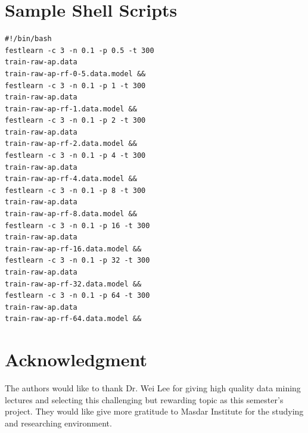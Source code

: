 \documentclass[journal]{IEEEtran}
\begin{document}
\appendices
\section{Sample Shell Scripts}

\begin{verbatim}
#!/bin/bash
festlearn -c 3 -n 0.1 -p 0.5 -t 300 
train-raw-ap.data 
train-raw-ap-rf-0-5.data.model &&
festlearn -c 3 -n 0.1 -p 1 -t 300 
train-raw-ap.data 
train-raw-ap-rf-1.data.model &&
festlearn -c 3 -n 0.1 -p 2 -t 300 
train-raw-ap.data 
train-raw-ap-rf-2.data.model &&
festlearn -c 3 -n 0.1 -p 4 -t 300 
train-raw-ap.data 
train-raw-ap-rf-4.data.model &&
festlearn -c 3 -n 0.1 -p 8 -t 300 
train-raw-ap.data 
train-raw-ap-rf-8.data.model &&
festlearn -c 3 -n 0.1 -p 16 -t 300 
train-raw-ap.data 
train-raw-ap-rf-16.data.model &&
festlearn -c 3 -n 0.1 -p 32 -t 300 
train-raw-ap.data 
train-raw-ap-rf-32.data.model &&
festlearn -c 3 -n 0.1 -p 64 -t 300 
train-raw-ap.data 
train-raw-ap-rf-64.data.model &&
\end{verbatim}

\section*{Acknowledgment}


The authors would like to thank Dr. Wei Lee for giving high quality data mining lectures and selecting this challenging but rewarding topic as this semester's project. They would like give more gratitude to Masdar Institute for the studying and researching environment.


\ifCLASSOPTIONcaptionsoff
  \newpage
\fi



\end{document}
